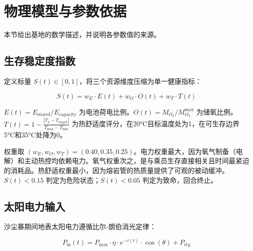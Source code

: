 \documentclass[11pt,a4paper]{ctexart}
\begin{document}
\section{物理模型与参数依据}

本节给出基地的数学描述，并说明各参数值的来源。

\subsection{生存稳定度指数}

定义标量 $S(t) \in [0,1]$，将三个资源维度压缩为单一健康指标：

\begin{equation}\label{eq:S}
  S(t) = w_E \cdot E(t) + w_O \cdot O(t) + w_T \cdot T(t)
\end{equation}

$E(t) = E_{\text{stored}} / E_{\text{capacity}}$ 为电池荷电比例。$O(t) = M_{O_2} / M_{O_2}^{\text{max}}$ 为储氧比例。$T(t) = 1 - \frac{|T_h - T_{\text{target}}|}{T_{\text{max}} - T_{\text{min}}}$ 为热舒适度评分，在20°C目标温度处为1，在可生存边界5°C和35°C处降为0。

权重取 $(w_E, w_O, w_T) = (0.40, 0.35, 0.25)$。电力权重最大，因为氧气制备（电解）和主动热控均依赖电力。氧气权重次之，是与乘员生存直接相关且时间最紧迫的消耗品。热舒适权重最小，因为熔岩管的热质量提供了可观的被动缓冲。$S(t) < 0.15$ 判定为危险状态；$S(t) < 0.05$ 判定为致命，回合终止。

\subsection{太阳电力输入}

沙尘暴期间地表太阳电力遵循比尔-朗伯消光定律：

\begin{equation}\label{eq:solar}
  P_{\text{in}}(t) = P_{\text{max}} \cdot \eta \cdot e^{-\tau(t)} \cdot \cos(\theta) + P_{\text{rtg}}
\end{equation}
\end{document}
